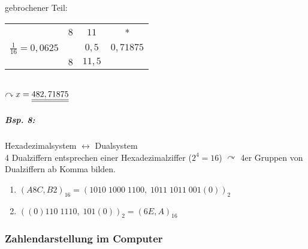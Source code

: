 gebrochener Teil:\\
\begin{tabular}{c | c c c}
 & $8$  &  $11$  & *\\
 $\frac{1}{16}=0,0625$  &   & $0,5$  & $\boxed{0,71875}$\\
 \hline
  & $8$ & $11,5$ & \\
\end{tabular}\\
$\curvearrowright x=\underline{\underline{482,71875}}$

\subparagraph{Bsp. 8:} Hexadezimalsystem $\leftrightarrow$ Dualsystem\\
4 Dualziffern entsprechen einer Hexadezimalziffer ($2^4=16$) $\curvearrowright$ 4er Gruppen von Dualziffern ab Komma bilden.
\begin{enumerate}[label=\alph*.)]
\item $(A8C,B2)_{16}=(1010 \; 1000 \; 1100, \; 1011 \; 1011 \; 001(0))_2$
\item $((0)110\; 1110, \; 101(0))_2 = (6E,A)_{16}$
\end{enumerate}

\subsubsection{Zahlendarstellung im Computer}


